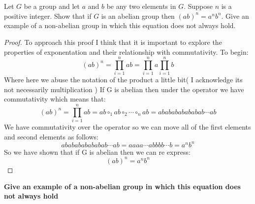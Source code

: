 \documentclass[11pt]{amsart}
\theoremstyle{definition}  %
\begin{document}
\noindent\makebox[\linewidth]{\rule{\paperwidth}{0.4pt}}
\\\\
 Let $G$ be a group and let $a$ and $b$ be any two elements in $G$. Suppose $n$ is a positive integer. Show that if $G$ is an abelian group then  $(ab)^n = a^nb^n$.
Give an example of a non-abelian group in which this equation does not always hold. \\
\begin{proof}
  To approach this proof I think that it is important to explore the properties of exponentation and their relationship with commutativity. To begin:
  \[
    (ab)^n=\prod_{i=1}^nab=\prod_{i=1}^na\prod_{i=1}^nb
  \]
  Where here we abuse the notation of the product a little bit( I acknowledge its not necessarily multiplication )
   If G is abelian then under the operator we have commutativity which means that:
   \[
     (ab)^n=\prod_{i=1}^nab=ab\circ_1 ab\circ_2 \cdots \circ_n ab=ababababababab\cdots ab
   \]
   We have commutativity over the operator so we can move all of the first elements and second elements as follows:
   \[
     ababababababab\cdots ab=aaaa\cdots abbbb\cdots b=a^nb^n
   \]
   So we have shown that if G is abelian then we can re express: \[
     (ab)^n=a^nb^n
   \]
\end{proof}
\textbf{ Give an example of a non-abelian group in which this equation does not always hold}
\end{document}
